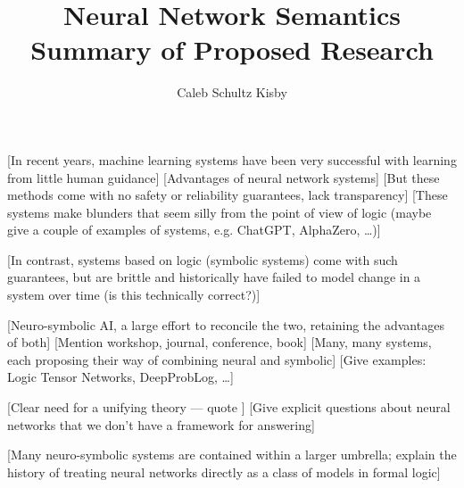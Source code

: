 \documentclass[letterpaper]{article}
\title{Neural Network Semantics\\\large{\textmd{Summary of Proposed Research}}}
\author{Caleb Schultz Kisby}
\begin{document}
\maketitle

[In recent years, machine learning systems have been very successful with learning from little human guidance] [Advantages of neural network systems] [But these methods come with no safety or reliability guarantees, lack transparency] [These systems make blunders that seem silly from the point of view of logic (maybe give a couple of examples of systems, e.g. ChatGPT, AlphaZero, \ldots)]

[In contrast, systems based on logic (symbolic systems) come with such guarantees, but are brittle and historically have failed to model change in a system over time (is this technically correct?)]

[Neuro-symbolic AI, a large effort to reconcile the two, retaining the advantages of both] [Mention workshop, journal, conference, book] [Many, many systems, each proposing their way of combining neural and symbolic] [Give examples: Logic Tensor Networks, DeepProbLog, \ldots]

[Clear need for a unifying theory --- quote \cite{harmelen2022preface}] [Give explicit questions about neural networks that we don't have a framework for answering]

[Many neuro-symbolic systems are contained within a larger umbrella; explain the history of treating neural networks directly as a class of models in formal logic]
\end{document}
